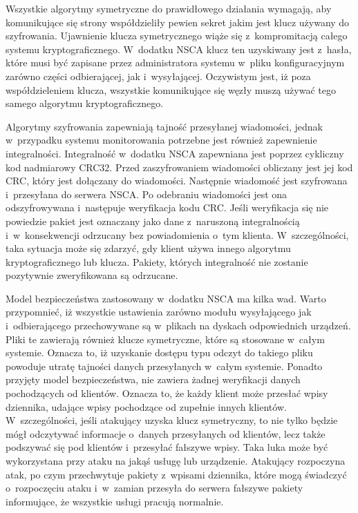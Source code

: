 Wszystkie algorytmy symetryczne do prawidłowego działania wymagają,
aby komunikujące się strony współdzieliły pewien sekret jakim jest
klucz używany do szyfrowania. Ujawnienie klucza symetrycznego wiąże
się z~kompromitacją całego systemu kryptograficznego. W~dodatku NSCA
klucz ten uzyskiwany jest z~hasła, które musi być zapisane przez
administratora systemu w~pliku konfiguracyjnym zarówno części
odbierającej, jak i~wysyłającej. Oczywistym jest, iż poza
współdzieleniem klucza, wszystkie komunikujące się węzły muszą używać
tego samego algorytmu kryptograficznego.

Algorytmy szyfrowania zapewniają tajność przesyłanej wiadomości,
jednak w~przypadku systemu monitorowania potrzebne jest również
zapewnienie integralności. Integralność w~dodatku NSCA zapewniana jest
poprzez cykliczny kod nadmiarowy CRC32. Przed zaszyfrowaniem
wiadomości obliczany jest jej kod CRC, który jest dołączany do
wiadomości. Następnie wiadomość jest szyfrowana i~przesyłana do
serwera NSCA. Po odebraniu wiadomości jest ona odszyfrowywana
i~następuje weryfikacja kodu CRC. Jeśli weryfikacja się nie powiedzie
pakiet jest oznaczany jako dane z~naruszoną integralnością
i~w~konsekwencji odrzucany bez powiadomienia o~tym
klienta. W~szczególności, taka sytuacja może się zdarzyć, gdy klient
używa innego algorytmu kryptograficznego lub klucza. Pakiety, których
integralność nie zostanie pozytywnie zweryfikowana są odrzucane.

Model bezpieczeństwa zastosowany w~dodatku NSCA ma kilka wad. Warto
przypomnieć, iż wszystkie ustawienia zarówno modułu wysyłającego jak
i~odbierającego przechowywane są w~plikach na dyskach odpowiednich
urządzeń. Pliki te zawierają również klucze symetryczne, które są
stosowane w~całym systemie. Oznacza to, iż uzyskanie dostępu typu
odczyt do takiego pliku powoduje utratę tajności danych przesyłanych
w~całym systemie. Ponadto przyjęty model bezpieczeństwa, nie zawiera
żadnej weryfikacji danych pochodzących od klientów. Oznacza to, że
każdy klient może przesłać wpisy dziennika, udające wpisy pochodzące
od zupełnie innych klientów. W~szczególności, jeśli atakujący uzyska
klucz symetryczny, to nie tylko będzie mógł odczytywać informacje
o~danych przesyłanych od klientów, lecz także podszywać się pod
klientów i~przesyłać fałszywe wpisy. Taka luka może być wykorzystana
przy ataku na jakąś usługę lub urządzenie. Atakujący rozpoczyna atak,
po czym przechwytuje pakiety z~wpisami dziennika, które mogą świadczyć
o~rozpoczęciu ataku i~w~zamian przesyła do serwera fałszywe pakiety
informujące, że wszystkie usługi pracują normalnie.

